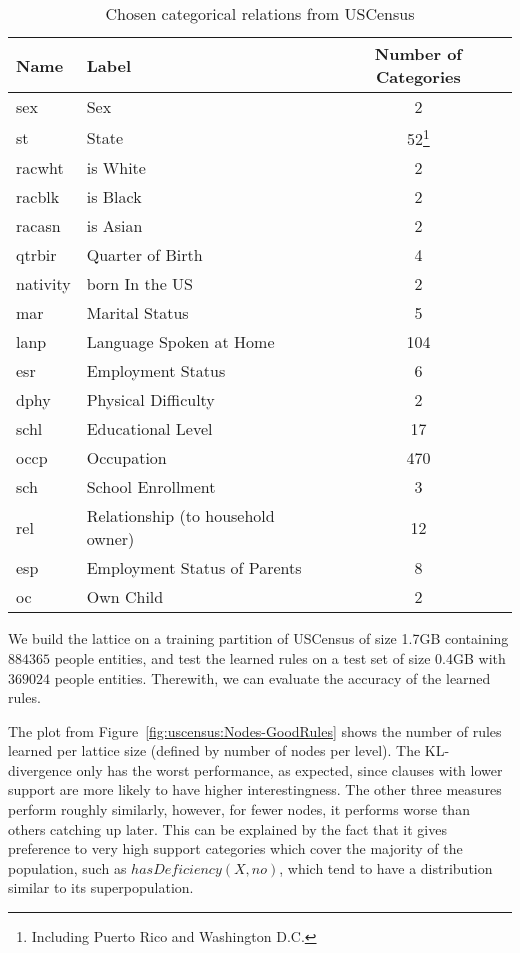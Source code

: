 \begin{table}[h!]
\begin{minipage}{\textwidth}
 \begin{center}
 \caption{Chosen categorical relations from USCensus}
  \begin{tabular}{l l c}
    \toprule
      Name	& Label				& Number of Categories \\
    \midrule
      sex	& Sex				&	2	\\
      st	& State				&	52\footnote{Including Puerto Rico and Washington D.C.}	\\
      racwht	& is White			&	2	\\
      racblk	& is Black			&	2	\\
      racasn	& is Asian			&	2	\\
      qtrbir	& Quarter of Birth		&	4	\\	
      nativity	& born In the US		&	2	\\
      mar	& Marital Status		&	5	\\
      lanp	& Language Spoken at Home	&	104	\\
      esr	& Employment Status		&	6	\\
      dphy	& Physical Difficulty		&	2	\\
      schl	& Educational Level		&	17	\\	
      occp	& Occupation			&	470	\\
      sch	& School Enrollment		&	3	\\
      rel	& Relationship (to household owner)		&	12	\\
      esp	& Employment Status of Parents	&	8	\\
      oc	& Own Child			&	2	\\
    \bottomrule
  \end{tabular}
 \label{tab:uscensusRelations}
 \end{center}
\end{minipage}
\end{table}

We build the lattice on a training partition of USCensus of size 1.7GB containing $884365$ people entities, and test the
learned rules on a test set of size 0.4GB with $369024$ people entities. Therewith, we can evaluate the accuracy of the
learned rules. 

The plot from Figure~\ref{fig:uscensus:Nodes-GoodRules} shows the number of rules learned per lattice size (defined by
number of nodes per level). The KL-divergence only has the worst performance, as expected, since clauses with lower
support are more likely to have higher interestingness. The other three measures perform roughly similarly, however, for
fewer nodes, it performs worse than others catching up later. This can be explained by the fact that it gives
preference to very high support categories which cover the majority of the population, such as $hasDeficiency(X,no)$,
which tend to have a distribution similar to its superpopulation. 

